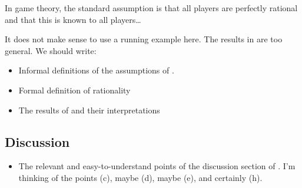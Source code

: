 In game theory, the standard assumption is that all players are perfectly rational and that this is known to all players\dots

{ \color{red} It does not make sense to use a running example here. The results in \cite{aumann1995a} are too general. We should write: }

\begin{itemize}
\color{red} 
\item Informal definitions of the assumptions of \cite{aumann1995a}.
\item Formal definition of rationality
\item The results of \cite{aumann1995a} and their interpretations
\end{itemize}

\subsection{Discussion}

\begin{itemize}
\color{red}
\item The relevant and easy-to-understand points of the discussion section of \cite{aumann1995a}. I'm thinking of the points (c), maybe (d), maybe (e), and certainly (h).
\end{itemize}
